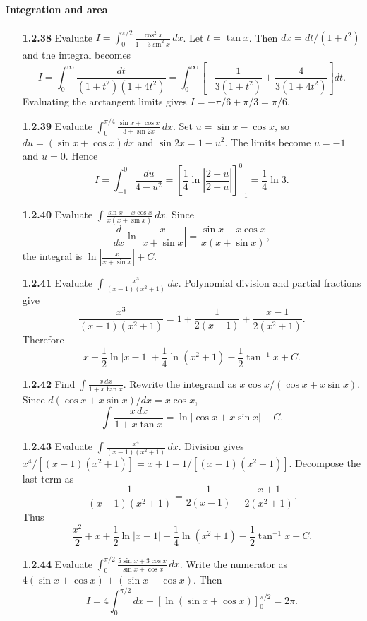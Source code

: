 \paragraph*{Integration and area}
\begin{enumerate}[label={},leftmargin=0pt,itemsep=9pt]
\item[\textbf{1.2.38}] Evaluate $\displaystyle I=\int_0^{\pi/2}\frac{\cos^2x}{1+3\sin^2x}\,dx$.
\solution Let $t=\tan x$. Then $dx=dt/(1+t^2)$ and the integral becomes
\[
I=\int_0^\infty\frac{dt}{(1+t^2)(1+4t^2)}=\int_0^\infty\left[-\frac1{3(1+t^2)}+\frac4{3(1+4t^2)}\right]dt.
\]
Evaluating the arctangent limits gives $I=-\pi/6+\pi/3=\pi/6$.

\item[\textbf{1.2.39}] Evaluate $\displaystyle\int_0^{\pi/4}\frac{\sin x+\cos x}{3+\sin2x}\,dx$.
\solution Set $u=\sin x-\cos x$, so $du=(\sin x+\cos x)dx$ and $\sin2x=1-u^2$. The limits become $u=-1$ and $u=0$. Hence
\[
I=\int_{-1}^{0}\frac{du}{4-u^2}=\left[\frac14\ln\left|\frac{2+u}{2-u}\right|\right]_{-1}^{0}=\frac14\ln3.
\]

\item[\textbf{1.2.40}] Evaluate $\displaystyle\int\frac{\sin x-x\cos x}{x(x+\sin x)}\,dx$.
\solution Since
\[
\frac{d}{dx}\ln\left|\frac{x}{x+\sin x}\right|=\frac{\sin x-x\cos x}{x(x+\sin x)},
\]
the integral is $\ln\left|\frac{x}{x+\sin x}\right|+C$.

\item[\textbf{1.2.41}] Evaluate $\displaystyle\int\frac{x^3}{(x-1)(x^2+1)}\,dx$.
\solution Polynomial division and partial fractions give
\[
\frac{x^3}{(x-1)(x^2+1)}=1+\frac1{2(x-1)}+\frac{x-1}{2(x^2+1)}.
\]
Therefore
\[
x+\frac12\ln|x-1|+\frac14\ln(x^2+1)-\frac12\tan^{-1}x+C.
\]

\item[\textbf{1.2.42}] Find $\displaystyle\int\frac{x\,dx}{1+x\tan x}$.
\solution Rewrite the integrand as $x\cos x/(\cos x+x\sin x)$. Since $d(\cos x+x\sin x)/dx=x\cos x$,
\[
\int\frac{x\,dx}{1+x\tan x}=\ln|\cos x+x\sin x|+C.
\]

\item[\textbf{1.2.43}] Evaluate $\displaystyle\int\frac{x^4}{(x-1)(x^2+1)}\,dx$.
\solution Division gives $x^4/[(x-1)(x^2+1)]=x+1+1/[(x-1)(x^2+1)]$. Decompose the last term as
\[
\frac1{(x-1)(x^2+1)}=\frac1{2(x-1)}-\frac{x+1}{2(x^2+1)}.
\]
Thus
\[
\frac{x^2}{2}+x+\frac12\ln|x-1|-\frac14\ln(x^2+1)-\frac12\tan^{-1}x+C.
\]

\item[\textbf{1.2.44}] Evaluate $\displaystyle\int_0^{\pi/2}\frac{5\sin x+3\cos x}{\sin x+\cos x}\,dx$.
\solution Write the numerator as $4(\sin x+\cos x)+(\sin x-\cos x)$. Then
\[
I=4\int_0^{\pi/2}dx-\left[\ln(\sin x+\cos x)\right]_0^{\pi/2}=2\pi.
\]


\end{enumerate}
